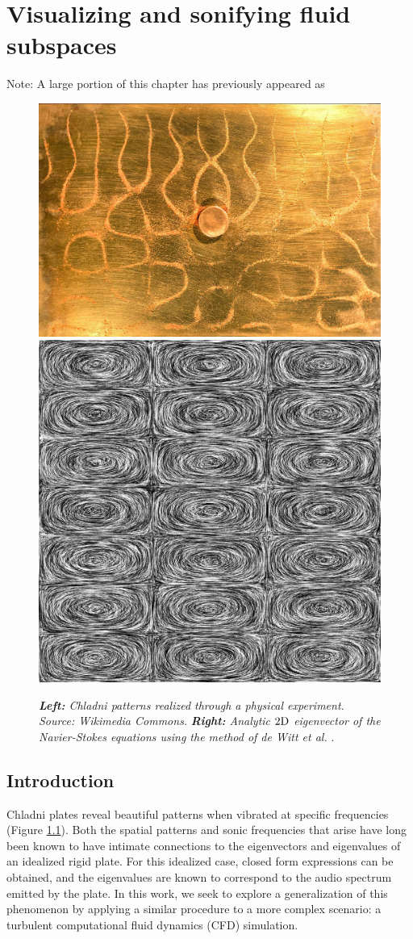 \chapter[Visualizing and sonifying fluid subspaces]{Visualizing and sonifying fluid subspaces}

Note: A large portion of this chapter has previously appeared as \cite{bridges2017:305}
\bigskip\bigskip

\begin{figure}[H]
		\centering
		\includegraphics[height=0.3\textwidth]{chap5/figures/chladni_plate.jpg}
		\includegraphics[height=0.3\textwidth]{chap5/figures/LIC.jpg}
		\caption{{\em{\bf Left:} Chladni patterns realized through a physical experiment. Source: Wikimedia Commons.} {\em{\bf Right:} Analytic $2\textnormal{D}$ eigenvector of the Navier-Stokes equations using the method of de Witt et al.} \cite{deWitt:2012}.}
		\label{fig:chladni-plate}
\end{figure}

\section*{Introduction}
Chladni plates reveal beautiful patterns when vibrated at specific frequencies (Figure \ref{fig:chladni-plate}). Both the spatial patterns and sonic frequencies that arise have long been known to have intimate connections to the eigenvectors and eigenvalues of an idealized rigid plate. For this idealized case, closed form expressions can be obtained, and the eigenvalues are known to correspond to the audio spectrum emitted by the plate. In this work, we seek to explore a generalization of this phenomenon by applying a similar procedure to a more complex scenario: a turbulent computational fluid dynamics (CFD) simulation.


